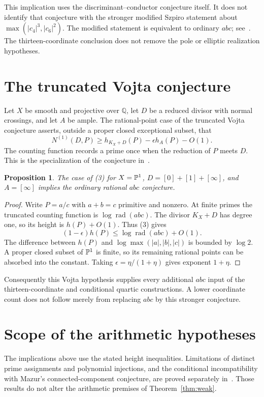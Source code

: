 \documentclass[11pt,a4paper]{article}
\newtheorem{proposition}[theorem]{Proposition}
\newcommand{\Q}{\mathbb Q}\newcommand{\Z}{\mathbb Z}
\DeclareMathOperator{\rad}{rad}
\begin{document}
This implication uses the discriminant--conductor conjecture itself.
It does not identify that conjecture with the stronger modified
Szpiro statement about $\max(|c_4|^3,|c_6|^2)$.
The modified statement is equivalent to ordinary $abc$;
see~\cite[\S I.3]{Oesterle}. The thirteen-coordinate conclusion
does not remove the pole or elliptic realization hypotheses.

\section{The truncated Vojta conjecture}

Let $X$ be smooth and projective over $\Q$, let $D$ be a
reduced divisor with normal crossings, and let $A$ be ample.
The rational-point case of the truncated Vojta conjecture
asserts, outside a proper closed exceptional subset, that
\[
 N^{(1)}(D,P)\ge h_{K_X+D}(P)-\epsilon h_A(P)-O(1).
 \tag{3}
\]
The counting function records a prime once when the reduction of
$P$ meets $D$. This is the specialization of the conjecture
in~\cite[Conjecture 2.3]{Vojta}.

\begin{proposition}
The case of (3) for
$X=\mathbb P^1$, $D=[0]+[1]+[\infty]$, and $A=[\infty]$
implies the ordinary rational $abc$ conjecture.
\end{proposition}
\begin{proof}
Write $P=a/c$ with $a+b=c$ primitive and nonzero.
At finite primes the truncated counting function is
$\log\rad(abc)$. The divisor $K_X+D$ has degree one, so
its height is $h(P)+O(1)$. Thus (3) gives
\[
 (1-\epsilon)h(P)\le\log\rad(abc)+O(1).
\]
The difference between $h(P)$ and
$\log\max(|a|,|b|,|c|)$ is bounded by $\log 2$.
A proper closed subset of $\mathbb P^1$ is finite, so its remaining
rational points can be absorbed into the constant.
Taking $\epsilon=\eta/(1+\eta)$ gives exponent $1+\eta$.
\end{proof}

Consequently this Vojta hypothesis supplies every additional
$abc$ input of the thirteen-coordinate and conditional quartic
constructions. A lower coordinate count does not follow merely
from replacing $abc$ by this stronger conjecture.

\section{Scope of the arithmetic hypotheses}

The implications above use the stated height inequalities. Limitations
of distinct prime assignments and polynomial injections, and the
conditional incompatibility with Mazur's connected-component
conjecture, are proved separately in~\cite{Limitations}. Those results
do not alter the arithmetic premises of Theorem~\ref{thm:weak}.
\end{document}
